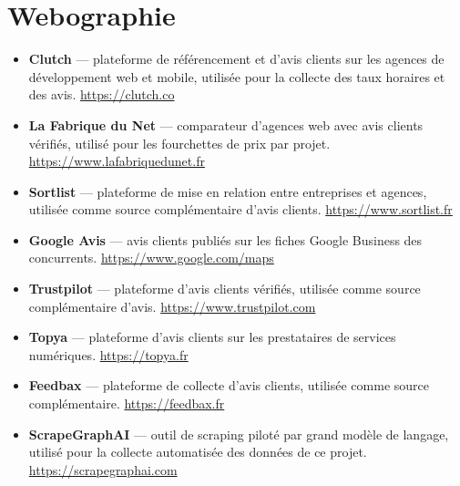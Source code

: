 \section*{Webographie}

\begin{itemize}
    \item \textbf{Clutch} --- plateforme de référencement et d'avis clients sur les agences de développement
    web et mobile, utilisée pour la collecte des taux horaires et des avis. \url{https://clutch.co}
    \item \textbf{La Fabrique du Net} --- comparateur d'agences web avec avis clients vérifiés, utilisé pour
    les fourchettes de prix par projet. \url{https://www.lafabriquedunet.fr}
    \item \textbf{Sortlist} --- plateforme de mise en relation entre entreprises et agences, utilisée comme
    source complémentaire d'avis clients. \url{https://www.sortlist.fr}
    \item \textbf{Google Avis} --- avis clients publiés sur les fiches Google Business des concurrents.
    \url{https://www.google.com/maps}
    \item \textbf{Trustpilot} --- plateforme d'avis clients vérifiés, utilisée comme source complémentaire
    d'avis. \url{https://www.trustpilot.com}
    \item \textbf{Topya} --- plateforme d'avis clients sur les prestataires de services numériques.
    \url{https://topya.fr}
    \item \textbf{Feedbax} --- plateforme de collecte d'avis clients, utilisée comme source complémentaire.
    \url{https://feedbax.fr}
    \item \textbf{ScrapeGraphAI} --- outil de scraping piloté par grand modèle de langage, utilisé pour la
    collecte automatisée des données de ce projet. \url{https://scrapegraphai.com}
    
\end{itemize}